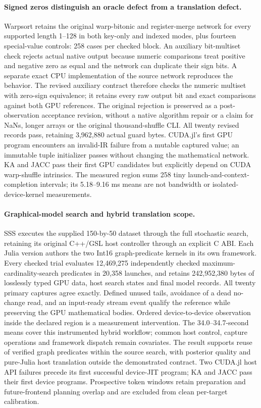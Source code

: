 \paragraph{Signed zeros distinguish an oracle defect from a translation defect.}
Warpsort retains the original warp-bitonic and register-merge network for every supported length 1--128 in both key-only and indexed modes, plus fourteen special-value controls: 258 cases per checked block. An auxiliary bit-multiset check rejects actual native output because numeric comparisons treat positive and negative zero as equal and the network can duplicate their sign bits. A separate exact CPU implementation of the source network reproduces the behavior. The revised auxiliary contract therefore checks the numeric multiset with zero-sign equivalence; it retains every raw output bit and exact comparisons against both GPU references. The original rejection is preserved as a post-observation acceptance revision, without a native algorithm repair or a claim for NaNs, longer arrays or the original thousand-shuffle CLI. All twenty revised records pass, retaining 3,962,880 actual guard bytes. CUDA.jl's first GPU program encounters an invalid-IR failure from a mutable captured value; an immutable tuple initializer passes without changing the mathematical network. KA and JACC pass their first GPU candidates but explicitly depend on CUDA warp-shuffle intrinsics. The measured region sums 258 tiny launch-and-context-completion intervals; its 5.18--9.16 ms means are not bandwidth or isolated-device-kernel measurements.

\paragraph{Graphical-model search and hybrid translation scope.}
SSS executes the supplied 150-by-50 dataset through the full stochastic search, retaining its original C++/GSL host controller through an explicit C ABI. Each Julia version authors the two Int16 graph-predicate kernels in its own framework. Every checked trial evaluates 12,469,275 independently checked maximum-cardinality-search predicates in 20,358 launches, and retains 242,952,380 bytes of losslessly typed GPU data, host search states and final model records. All twenty primary captures agree exactly. Defined unused tails, avoidance of a dead no-change read, and an input-ready stream event qualify the reference while preserving the GPU mathematical bodies. Ordered device-to-device observation inside the declared region is a measurement intervention. The 34.0--34.7-second means cover this instrumented hybrid workflow; common host control, capture operations and framework dispatch remain covariates. The result supports reuse of verified graph predicates within the source search, with posterior quality and pure-Julia host translation outside the demonstrated contract. Two CUDA.jl host API failures precede its first successful device-JIT program; KA and JACC pass their first device programs. Prospective token windows retain preparation and future-frontend planning overlap and are excluded from clean per-target calibration.

